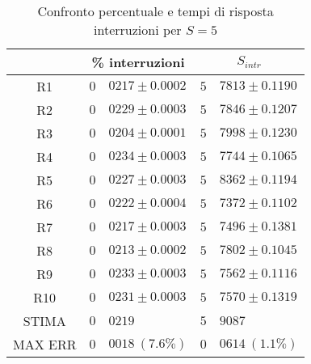 \begin{table}[!h]
\begin{tabular}{c|r@{.}l|r@{.}l}
& \multicolumn{2}{|c|}{\% interruzioni}
& \multicolumn{2}{|c}{$S_{intr}$}
\\          
\hline
R1      & $0$&$0217 \pm 0.0002$ & $5$&$7813 \pm 0.1190$ \\
R2      & $0$&$0229 \pm 0.0003$ & $5$&$7846 \pm 0.1207$ \\
R3      & $0$&$0204 \pm 0.0001$ & $5$&$7998 \pm 0.1230$ \\
R4      & $0$&$0234 \pm 0.0003$ & $5$&$7744 \pm 0.1065$ \\
R5      & $0$&$0227 \pm 0.0003$ & $5$&$8362 \pm 0.1194$ \\
R6      & $0$&$0222 \pm 0.0004$ & $5$&$7372 \pm 0.1102$ \\
R7      & $0$&$0217 \pm 0.0003$ & $5$&$7496 \pm 0.1381$ \\
R8      & $0$&$0213 \pm 0.0002$ & $5$&$7802 \pm 0.1045$ \\
R9      & $0$&$0233 \pm 0.0003$ & $5$&$7562 \pm 0.1116$ \\
R10     & $0$&$0231 \pm 0.0003$ & $5$&$7570 \pm 0.1319$ \\
STIMA   & $0$&$0219$            & $5$&$9087$            \\
MAX ERR & $0$&$0018 \ (7.6\%)$  & $0$&$0614 \ (1.1\%)$    
\end{tabular}
\centering
\caption{Confronto percentuale e tempi di risposta interruzioni per $S=5$}
\label{tab:5_sintr}
\end{table}
